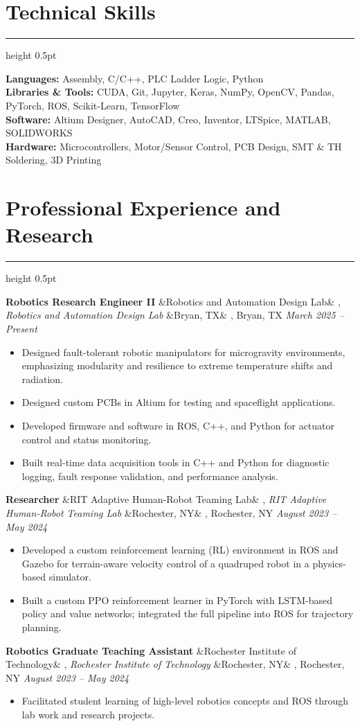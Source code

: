 \documentclass[letterpaper,10pt]{article}
\newcommand{\heading}[1]{%
    \vspace{-5mm} %
    \section*{#1}%
    \vspace{-3mm}%
    \noindent\hrule height 0.5pt %
    \vspace{4mm}%
}
\newcommand{\experience}[5]{%
    \noindent\textbf{#1}%
    \ifx&#2&
    \else
        , \textit{#2}%
    \fi
    \ifx&#3&
    \else
        , #3%
    \fi
    \hfill \textit{#4} \\
    \vspace{-6.8mm}%
    \begin{itemize}[itemsep=-5pt]
        \setlength{\itemindent}{0em}
        #5
    \end{itemize}
    \vspace{1mm}
}
\begin{document}
\heading{Technical Skills}
\vspace{-1mm}%
\noindent\textbf{Languages:} Assembly, C/C++, PLC Ladder Logic, Python \\
\textbf{Libraries \& Tools:} CUDA, Git, Jupyter, Keras, NumPy, OpenCV, Pandas, PyTorch, ROS, Scikit-Learn, TensorFlow \\
\textbf{Software:} Altium Designer, AutoCAD, Creo, Inventor, LTSpice, MATLAB, SOLIDWORKS \\
\textbf{Hardware:} Microcontrollers, Motor/Sensor Control, PCB Design, SMT \& TH Soldering, 3D Printing \\


\heading{Professional Experience and Research}

\experience
    {Robotics Research Engineer II}
    {Robotics and Automation Design Lab}
    {Bryan, TX}
    {March 2025 – Present}
    {
        \item Designed fault-tolerant robotic manipulators for microgravity environments, emphasizing modularity and resilience to extreme temperature shifts and radiation.
        \item Designed custom PCBs in Altium for testing and spaceflight applications.
        \item Developed firmware and software in ROS, C++, and Python for actuator control and status monitoring.
        \item Built real-time data acquisition tools in C++ and Python for diagnostic logging, fault response validation, and performance analysis.
    }

\experience
    {Researcher}
    {RIT Adaptive Human-Robot Teaming Lab}
    {Rochester, NY}
    {August 2023 – May 2024}
    {
        \item  Developed a custom reinforcement learning (RL) environment in ROS and Gazebo for terrain-aware velocity control of a quadruped robot in a physics-based simulator.
        \item  Built a custom PPO reinforcement learner in PyTorch with LSTM-based policy and value networks; integrated the full pipeline into ROS for trajectory planning.
    }
    
\experience
    {Robotics Graduate Teaching Assistant}
    {Rochester Institute of Technology}
    {Rochester, NY}
    {August 2023 – May 2024}
    {
        \item  Facilitated student learning of high-level robotics concepts and ROS through lab work and research projects.
    }
\end{document}
